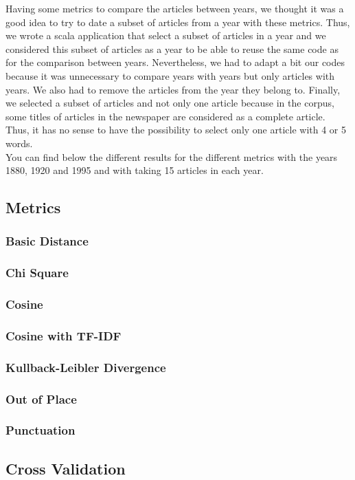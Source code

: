 Having some metrics to compare the articles between years, we thought it was a good idea to try to date a subset of articles from a year with these metrics. Thus, we wrote a scala application that select a subset of articles in a year and we considered this subset of articles as a year to be able to reuse the same code as for the comparison between years. Nevertheless, we had to adapt a bit our codes because it was unnecessary to compare years with years but only articles with years. We also had to remove the articles from the year they belong to. Finally, we selected a subset of articles and not only one article because in the corpus, some titles of articles in the newspaper are considered as a complete article. Thus, it has no sense to have the possibility to select only one article with 4 or 5 words.\\

You can find below the different results for the different metrics with the years 1880, 1920 and 1995 and with taking 15 articles in each year.

\subsection{Metrics}

\subsubsection{Basic Distance}
\subsubsection{Chi Square}
\subsubsection{Cosine}
\subsubsection{Cosine with TF-IDF}
\subsubsection{Kullback-Leibler Divergence}


\subsubsection{Out of Place}
\subsubsection{Punctuation}

\subsection{Cross Validation}
